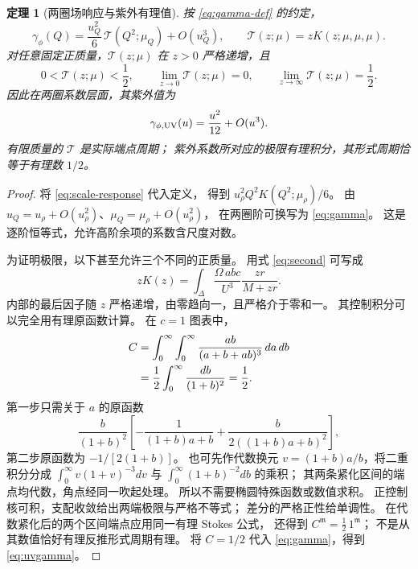 \documentclass[11pt,a4paper]{ctexart}
\theoremstyle{cnplain}
\newtheorem{theorem}{定理}[section]
\theoremstyle{remark}\newtheorem{remark}[theorem]{注}
\begin{document}
\begin{theorem}[两圈场响应与紫外有理值]\label{thm:gamma}
按 \eqref{eq:gamma-def} 的约定，
\begin{equation}\label{eq:gamma}
 \gamma_\phi(Q)=\frac{u_Q^2}{6}\,\mathcal T(Q^2;\mu_Q)+O(u_Q^3),
 \qquad
 \mathcal T(z;\mu)=zK(z;\mu,\mu,\mu).
\end{equation}
对任意固定正质量，$\mathcal T(z;\mu)$ 在 $z>0$ 严格递增，且
\begin{equation}\label{eq:threshold}
 0<\mathcal T(z;\mu)<\frac12,\qquad
 \lim_{z\to0}\mathcal T(z;\mu)=0,\qquad
 \lim_{z\to\infty}\mathcal T(z;\mu)=\frac12.
\end{equation}
因此在两圈系数层面，其紫外值为
\begin{equation}\label{eq:uvgamma}
 \gamma_{\phi,\rm UV}(u)=\frac{u^2}{12}+O(u^3).
\end{equation}
有限质量的 $\mathcal T$ 是实际端点周期；
紫外系数所对应的极限有理积分，其形式周期恰等于有理数 $1/2$。
\end{theorem}
\begin{proof}
将 \eqref{eq:scale-response} 代入定义，
得到 $u_\rho^2Q^2K(Q^2;\mu_\rho)/6$。
由 $u_Q=u_\rho+O(u_\rho^2)$、$\mu_Q=\mu_\rho+O(u_\rho^2)$，
在两圈阶可换写为 \eqref{eq:gamma}。
这是逐阶恒等式，允许高阶余项的系数含尺度对数。

为证明极限，以下甚至允许三个不同的正质量。
用式 \eqref{eq:second} 可写成
\begin{equation}\label{eq:monotone}
 zK(z)=\int_\Delta\frac{\Omega\,abc}{U^3}
                    \frac{zr}{M+zr}.
\end{equation}
内部的最后因子随 $z$ 严格递增，由零趋向一，且严格介于零和一。
其控制积分可以完全用有理原函数计算。
在 $c=1$ 图表中，
\begin{align}
 C&=\int_0^\infty\int_0^\infty
          \frac{ab}{(a+b+ab)^3}\,da\,db \notag\\
  &=\frac12\int_0^\infty\frac{db}{(1+b)^2}
   =\frac12. \label{eq:C}
\end{align}
第一步只需关于 $a$ 的原函数
\[
 \frac{b}{(1+b)^2}
 \left[-\frac{1}{(1+b)a+b}
       +\frac{b}{2((1+b)a+b)^2}\right],
\]
第二步原函数为 $-1/[2(1+b)]$。
也可先作代数换元 $v=(1+b)a/b$，将二重积分分成
$\int_0^\infty v(1+v)^{-3}dv$ 与
$\int_0^\infty(1+b)^{-2}db$ 的乘积；
其两条紧化区间的端点均代数，角点经同一吹起处理。
所以不需要椭圆特殊函数或数值求积。
正控制核可积，支配收敛给出两端极限与严格不等式；
差分的严格正性给单调性。
在代数紧化后的两个区间端点应用同一有理 Stokes 公式，
还得到 $C^{\mathfrak m}=\tfrac12\,1^{\mathfrak m}$；
不是从其数值恰好有理反推形式周期有理。
将 $C=1/2$ 代入 \eqref{eq:gamma}，得到 \eqref{eq:uvgamma}。
\end{proof}
\end{document}
